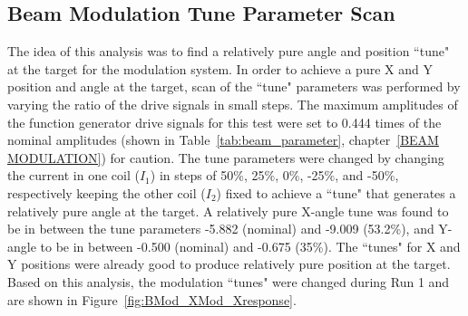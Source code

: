 %
%
%
%


\subsection{Beam Modulation Tune Parameter Scan}
\label{Beam Modulation Tune Parameter Scan}

The idea of this analysis was to find a relatively pure angle and position ``tune" at the target for the modulation system. In order to achieve a pure X and Y position and angle at the target, scan of the ``tune" parameters was performed by varying the ratio of the drive signals in small steps. The maximum amplitudes of the function generator drive signals for this test were set to 0.444 times of the nominal amplitudes (shown in Table~\ref{tab:beam_parameter}, chapter~\ref{BEAM MODULATION}) for caution. The tune parameters were changed by changing the current in one coil ($I_{1}$) in steps of 50\%, 25\%, 0\%, -25\%, and -50\%, respectively keeping the other coil ($I_{2}$) fixed to achieve a ``tune" that generates a relatively pure angle at the target. 
A relatively pure X-angle tune was found to be in between the tune parameters -5.882 (nominal) and -9.009 (53.2\%), and Y-angle to be in between -0.500 (nominal) and -0.675 (35\%). The ``tunes" for X and Y positions were already good to produce relatively pure position at the target. Based on this analysis, the modulation ``tunes" were changed during Run 1 and are shown in Figure~\ref{fig:BMod_XMod_Xresponse}.


